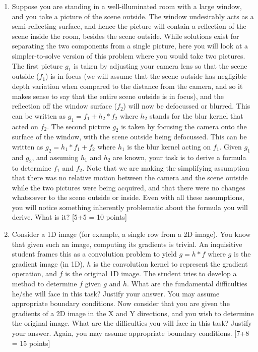 \documentclass[11pt]{article}
\begin{document}
\begin{enumerate}
\item Suppose you are standing in a well-illuminated room with a large window, and you take a picture of the scene outside. The window undesirably acts as a semi-reflecting surface, and hence the picture will contain a reflection of the scene inside the room, besides the scene outside. While solutions exist for separating the two components from a single picture, here you will look at a simpler-to-solve version of this problem where you would take two pictures. The first picture $g_1$ is taken by adjusting your camera lens so that the scene outside ($f_1$) is in focus (we will assume that the scene outside has negligible depth variation when compared to the distance from the camera, and so it makes sense to say that the entire scene outside is in focus), and the reflection off the window surface ($f_2$) will now be defocussed or blurred.  This can be written as $g_1 = f_1 + h_2 * f_2$ where $h_2$ stands for the blur kernel that acted on $f_2$. The second picture $g_2$ is taken by focusing the camera onto the surface of the window, with the scene outside being defocussed. This can be written as $g_2 = h_1 * f_1 + f_2$ where $h_1$ is the blur kernel acting on $f_1$. Given $g_1$ and $g_2$, and assuming $h_1$ and $h_2$ are known, your task is to derive a formula to determine $f_1$ and $f_2$. Note that we are making the simplifying assumption that there was no relative motion between the camera and the scene outside while the two pictures were being acquired, and that there were no changes whatsoever to the scene outside or inside. Even with all these assumptions, you will notice something inherently problematic about the formula you will derive. What is it? \textsf[5+5 = 10 points]

\item Consider a 1D image (for example, a single row from a 2D image). You know that given such an image, computing its gradients is trivial. An inquisitive student frames this as a convolution problem to yield $g = h*f$ where $g$ is the gradient image (in 1D), $h$ is the convolution kernel to represent the gradient operation, and $f$ is the original 1D image. The student tries to develop a method to determine $f$ given $g$ and $h$. What are the fundamental difficulties he/she will face in this task? Justify your answer. You may assume appropriate boundary conditions. Now consider that you are given the gradients of a 2D image in the X and Y directions, and you wish to determine the original image. What are the difficulties you will face in this task? Justify your answer. Again, you may assume appropriate boundary conditions. \textsf{[7+8 = 15 points]}


\end{enumerate}
\end{document}
